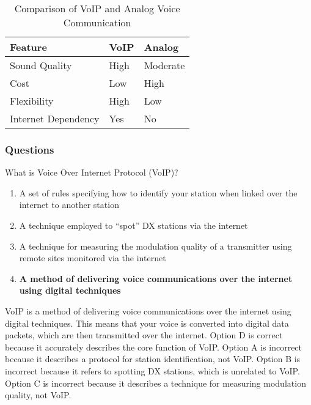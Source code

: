 \begin{table}[h]
    \centering
    \begin{tabular}{|l|l|l|}
        \hline
        \textbf{Feature} & \textbf{VoIP} & \textbf{Analog} \\
        \hline
        Sound Quality & High & Moderate \\
        Cost & Low & High \\
        Flexibility & High & Low \\
        Internet Dependency & Yes & No \\
        \hline
    \end{tabular}
    \caption{Comparison of VoIP and Analog Voice Communication}
    \label{tab:voip-comparison}
\end{table}

\subsubsection*{Questions}

\begin{tcolorbox}[colback=gray!10!white,colframe=black!75!black,title={T8C07}]
    What is Voice Over Internet Protocol (VoIP)?
    \begin{enumerate}[label=\Alph*),noitemsep]
        \item A set of rules specifying how to identify your station when linked over the internet to another station
        \item A technique employed to “spot” DX stations via the internet
        \item A technique for measuring the modulation quality of a transmitter using remote sites monitored via the internet
        \item \textbf{A method of delivering voice communications over the internet using digital techniques}
    \end{enumerate}
\end{tcolorbox}

VoIP is a method of delivering voice communications over the internet using digital techniques. This means that your voice is converted into digital data packets, which are then transmitted over the internet. Option D is correct because it accurately describes the core function of VoIP. Option A is incorrect because it describes a protocol for station identification, not VoIP. Option B is incorrect because it refers to spotting DX stations, which is unrelated to VoIP. Option C is incorrect because it describes a technique for measuring modulation quality, not VoIP.
